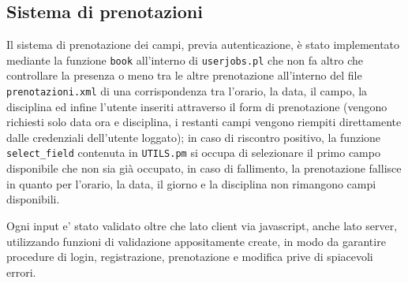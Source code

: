 \subsection{Sistema di prenotazioni}
Il sistema di prenotazione dei campi, previa autenticazione, è stato implementato mediante la funzione \texttt{book} all'interno di \texttt{userjobs.pl} che non fa altro che controllare la presenza o meno tra le altre prenotazione all'interno del file \texttt{prenotazioni.xml} di una corrispondenza tra l'orario, la data, il campo, la disciplina ed infine l'utente inseriti attraverso il form di prenotazione (vengono richiesti solo data ora e disciplina, i restanti campi vengono riempiti direttamente dalle credenziali dell'utente loggato); in caso di riscontro positivo, la funzione \texttt{select\_field} contenuta in \texttt{UTILS.pm} si occupa di selezionare il primo campo disponibile che non sia già occupato, in caso di fallimento, la prenotazione fallisce in quanto per l'orario, la data, il giorno e la disciplina non rimangono campi disponibili.

Ogni input e' stato validato oltre che lato client via javascript, anche lato server, utilizzando funzioni di validazione appositamente create, in modo da garantire procedure di login, registrazione, prenotazione e modifica prive di spiacevoli errori.
